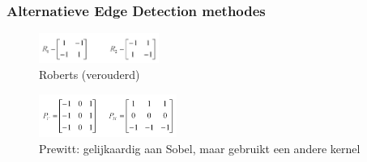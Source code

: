 \documentclass{article}
\begin{document}
\subsubsection{Alternatieve Edge Detection methodes}

\begin{figure}[H]
    \centering
    \includegraphics[width=0.35\textwidth]{roberts.png}
    \caption{Roberts (verouderd)}
\end{figure}

\begin{figure}[H]
    \centering
    \includegraphics[width=0.4\textwidth]{prewitt.png}
    \caption{Prewitt: gelijkaardig aan Sobel, maar gebruikt een andere kernel}
\end{figure}
\end{document}
